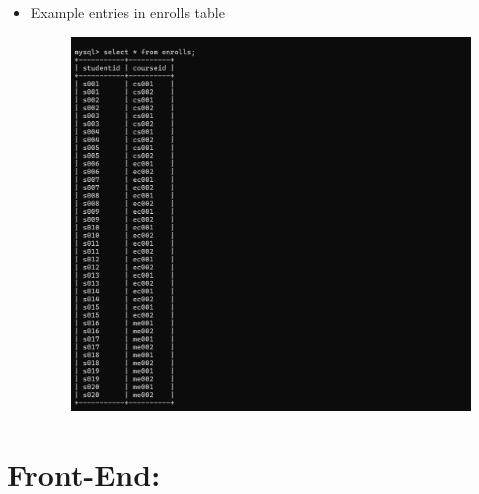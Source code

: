 \documentclass{article}
\begin{document}
\begin{itemize}
    \item \thispagestyle{empty}
    {\large{Example entries in enrolls table}}
    \begin{figure}[H]
        \centering
        \includegraphics[width=1.1\textwidth, center]{10}
    \end{figure}
\end{itemize}

\newpage

\section*{\huge{Front-End:}}
\end{document}
